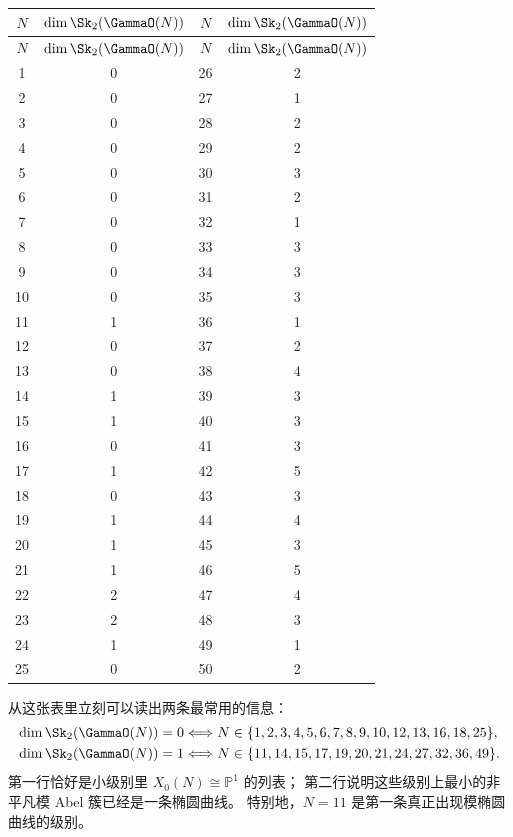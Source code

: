 \begin{center}
\small
\begin{longtable}{@{}cccc@{}}
\toprule
$N$ & $\dim \Sk_2(\GammaO(N))$ & $N$ & $\dim \Sk_2(\GammaO(N))$ \\
\midrule
\endfirsthead
\toprule
$N$ & $\dim \Sk_2(\GammaO(N))$ & $N$ & $\dim \Sk_2(\GammaO(N))$ \\
\midrule
\endhead
1 & 0 & 26 & 2 \\
2 & 0 & 27 & 1 \\
3 & 0 & 28 & 2 \\
4 & 0 & 29 & 2 \\
5 & 0 & 30 & 3 \\
6 & 0 & 31 & 2 \\
7 & 0 & 32 & 1 \\
8 & 0 & 33 & 3 \\
9 & 0 & 34 & 3 \\
10 & 0 & 35 & 3 \\
11 & 1 & 36 & 1 \\
12 & 0 & 37 & 2 \\
13 & 0 & 38 & 4 \\
14 & 1 & 39 & 3 \\
15 & 1 & 40 & 3 \\
16 & 0 & 41 & 3 \\
17 & 1 & 42 & 5 \\
18 & 0 & 43 & 3 \\
19 & 1 & 44 & 4 \\
20 & 1 & 45 & 3 \\
21 & 1 & 46 & 5 \\
22 & 2 & 47 & 4 \\
23 & 2 & 48 & 3 \\
24 & 1 & 49 & 1 \\
25 & 0 & 50 & 2 \\
\bottomrule
\end{longtable}
\normalsize
\end{center}

从这张表里立刻可以读出两条最常用的信息：
\begin{align*}
  \dim \Sk_2(\GammaO(N))=0
  &\Longleftrightarrow
  N\in\{1,2,3,4,5,6,7,8,9,10,12,13,16,18,25\},\\
  \dim \Sk_2(\GammaO(N))=1
  &\Longleftrightarrow
  N\in\{11,14,15,17,19,20,21,24,27,32,36,49\}.
\end{align*}
第一行恰好是小级别里 $X_0(N)\cong \mathbb P^1$ 的列表；
第二行说明这些级别上最小的非平凡模 Abel 簇已经是一条椭圆曲线。
特别地，$N=11$ 是第一条真正出现模椭圆曲线的级别。

